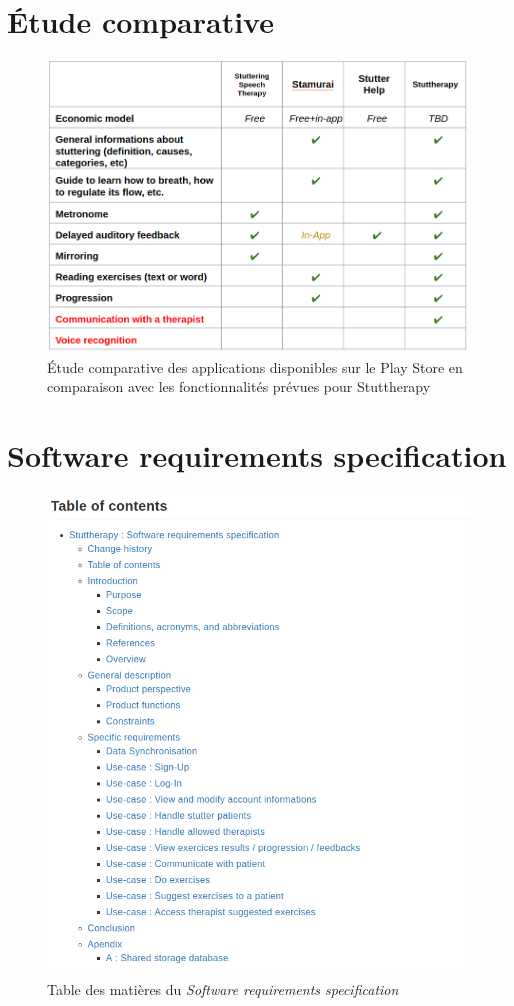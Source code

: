 \begin{appendices}
\chapter{Étude comparative}
\label{appendix:market}
\begin{figure}[h]
  \includegraphics[width=1\linewidth]{content/imgs/market.png}
  \caption*{Étude comparative des applications disponibles sur le Play Store en comparaison avec les fonctionnalités prévues pour Stuttherapy}
\end{figure}



\chapter{Software requirements specification}
\label{appendix:srs}
\begin{figure}[h]
  \includegraphics[width=0.7\linewidth]{content/imgs/srs_contents.png}
  \caption*{Table des matières du \textit{Software requirements specification}}
\end{figure}


\end{appendices}
